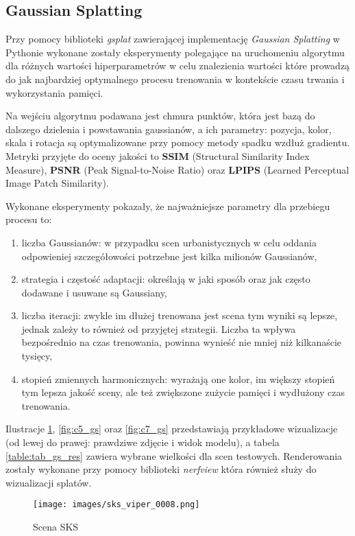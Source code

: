 \subsection{Gaussian Splatting}
Przy pomocy biblioteki \textit{gsplat}\cite{ye2024gsplatopensourcelibrarygaussian} zawierającej implementację \textit{Gaussian Splatting} w Pythonie wykonane zostały eksperymenty polegające na uruchomeniu algorytmu dla różnych wartości hiperparametrów w celu znalezienia wartości które prowadzą do jak najbardziej optymalnego procesu trenowania w kontekście czasu trwania i wykorzystania pamięci. 

Na wejściu algorytmu podawana jest chmura punktów, która jest bazą do dalszego dzielenia i powstawania gaussianów, a ich parametry: pozycja, kolor, skala i rotacja są optymalizowane przy pomocy metody spadku wzdłuż gradientu. Metryki przyjęte do oceny jakości to \textbf{SSIM} (Structural Similarity Index Measure), \textbf{PSNR} (Peak Signal-to-Noise Ratio) oraz \textbf{LPIPS} (Learned Perceptual Image Patch Similarity).

Wykonane eksperymenty pokazały, że najważniejsze parametry dla przebiegu procesu to: 
\begin{enumerate}
    \item liczba Gaussianów: w przypadku scen urbanistycznych w celu oddania odpowieniej szczegółowości potrzebne jest kilka milionów Gaussianów,
    \item strategia i częstość adaptacji: określają w jaki sposób oraz jak często dodawane i usuwane są Gaussiany, 
    \item liczba iteracji: zwykle im dłużej trenowana jest scena tym wyniki są lepsze, jednak zależy to również od przyjętej strategii. Liczba ta wpływa bezpośrednio na czas trenowania, powinna wynieść nie mniej niż kilkanaście tysięcy,
    \item stopień zmiennych harmonicznych: wyrażają one kolor, im większy stopień tym lepsza jakość sceny, ale też zwiększone zużycie pamięci i wydłużony czas trenowania. 
\end{enumerate}

Ilustracje \ref{fig:sks_gs}, \ref{fig:c5_gs} oraz \ref{fig:c7_gs} przedstawiają przykładowe wizualizacje (od lewej do prawej: prawdziwe zdjęcie i widok modelu), a tabela \ref{table:tab_gs_res} zawiera wybrane wielkości dla scen testowych. Renderowania zostały wykonane przy pomocy biblioteki \textit{nerfview} która również służy do wizualizacji splatów.

\begin{figure}[!h]
    \centering
    \texttt{[image: images/sks\_viper\_0008.png]}
    \caption{Scena SKS}
    \label{fig:sks_gs}
\end{figure}

